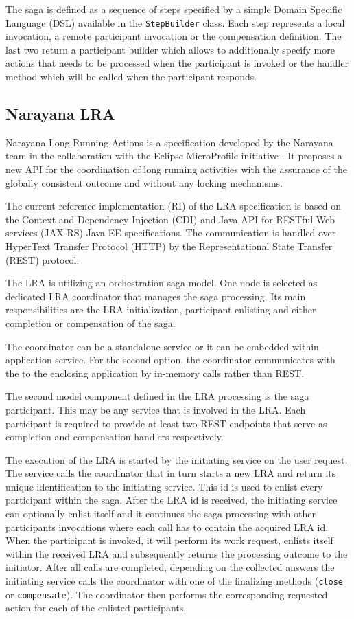 \documentclass[oneside,
  digital, %
  table,   %
  nolof,     %
  nolot,     %
]{fithesis3}
\begin{document}
The saga is defined as a sequence of steps specified by a simple Domain Specific Language (DSL) available in the \texttt{StepBuilder} class. Each step represents a local invocation, a remote participant invocation or the compensation definition. The last two return a participant builder which allows to additionally specify more actions that needs to be processed when the participant is invoked or the handler method which will be called when the participant responds.

\subsection{Narayana LRA}

Narayana Long Running Actions is a specification developed by the Narayana team in the collaboration with the Eclipse MicroProfile initiative \cite{saga-impl-comp}. It proposes a new API for the coordination of long running activities with the assurance of the globally consistent outcome and without any locking mechanisms.

The current reference implementation (RI) of the LRA specification is based on the Context and Dependency Injection (CDI) and Java API for RESTful Web services (JAX-RS) Java EE specifications. The communication is handled over HyperText Transfer Protocol (HTTP) by the Representational State Transfer (REST) protocol.

The LRA is utilizing an orchestration saga model. One node is selected as dedicated LRA coordinator that manages the saga processing. Its main responsibilities are the LRA initialization, participant enlisting and either completion or compensation of the saga. 

The coordinator can be a standalone service or it can be embedded within application service. For the second option, the coordinator communicates with the to the enclosing application by in-memory calls rather than REST.

The second model component defined in the LRA processing is the saga participant. This may be any service that is involved in the LRA. Each participant is required to provide at least two REST endpoints that serve as completion and compensation handlers respectively.

The execution of the LRA is started by the initiating service on the user request. The service calls the coordinator that in turn starts a new LRA and return its  unique identification to the initiating service. This id is used to enlist every participant within the saga. After the LRA id is received, the initiating service can optionally enlist itself and it continues the saga processing with other participants invocations where each call has to contain the acquired LRA id. When the participant is invoked, it will perform its work request, enlists itself within the received LRA and subsequently returns the processing outcome to the initiator. After all calls are completed, depending on the collected answers the initiating service calls the coordinator with one of the finalizing methods (\texttt{close} or \texttt{compensate}). The coordinator then performs the corresponding requested action for each of the enlisted participants.
 
\end{document}
